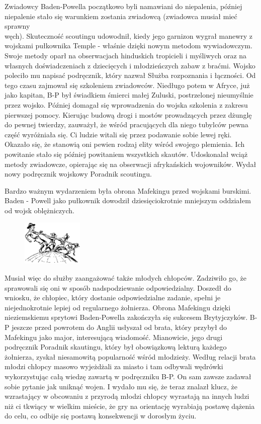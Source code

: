 Zwiadowcy Baden-Powella początkowo byli namawiani do niepalenia, później niepalenie stało się warunkiem zostania zwiadowcą (zwiadowca musiał mieć sprawny \\ węch). 
Skuteczność scoutingu udowodnił, kiedy jego garnizon wygrał manewry z wojskami pułkownika Temple - właśnie dzięki nowym metodom wywiadowczym. 
Swoje metody oparł na obserwacjach hinduskich tropicieli i myśliwych oraz na własnych doświadczeniach z dziecięcych i młodzieńczych zabaw z braćmi. Wojsko poleciło mu napisać podręcznik, który nazwał Służba rozpoznania i łączności. 
Od tego czasu zajmował się szkoleniem zwiadowców. 
Niedługo potem w Afryce, już jako kapitan, B-P był świadkiem śmierci małej Zuluski, postrzelonej nieumyślnie przez wojsko. 
Później domagał się wprowadzenia do wojska szkolenia z zakresu pierwszej pomocy. 
Kierując budową drogi i mostów prowadzących przez dżunglę do pewnej twierdzy, zauważył, że wśród pracujących dla niego tubylców pewna część wyróżniała się. 
Ci ludzie witali się przez podawanie sobie lewej ręki. 
Okazało się, że stanowią oni pewien rodzaj elity wśród swojego plemienia. Ich powitanie stało się później powitaniem wszystkich skautów. 
Udoskonalał wciąż metody zwiadowcze, opierając się na obserwacji afrykańskich wojowników. Wydał nowy podręcznik wojskowy Poradnik scoutingu.

Bardzo ważnym wydarzeniem była obrona Mafekingu przed wojskami burskimi. Baden - Powell jako pułkownik dowodził dziesięciokrotnie mniejszym oddziałem od wojsk oblężniczych. 
\begin{figure}
  \begin{center}
    \includegraphics[width=2.9cm]{grafiki/bardzo.png}
  \end{center}
\end{figure}
Musiał więc do służby zaangażować także młodych chłopców. Zadziwiło go, że sprawowali się oni w sposób nadspodziewanie odpowiedzialny. Doszedł do wniosku, że chłopiec, który dostanie odpowiedzialne zadanie, spełni je niejednokrotnie lepiej od regularnego żołnierza. Obrona Mafekingu dzięki nieziemskiemu sprytowi Baden-Powella zakończyła się sukcesem Brytyjczyków. B-P jeszcze przed powrotem do Anglii usłyszał od brata, który przybył do Mafekingu jako major, interesującą wiadomość. Mianowicie, jego drugi podręcznik Poradnik skautingu, który był obowiązkową lekturą każdego żołnierza, zyskał niesamowitą popularność wśród młodzieży. Według relacji brata młodzi chłopcy masowo wyjeżdżali za miasto i tam odbywali wędrówki wykorzystując całą wiedzę zawartą w podręczniku B-P. On sam zawsze zadawał sobie pytanie jak uniknąć wojen. I wydało mu się, że teraz znalazł klucz, że wzrastający w obcowaniu z przyrodą młodzi chłopcy wyrastają na innych ludzi niż ci tkwiący w wielkim mieście, że gry na orientację wyrabiają postawę dążenia do celu, co odbije się postawą konsekwencji w dorosłym życiu.

